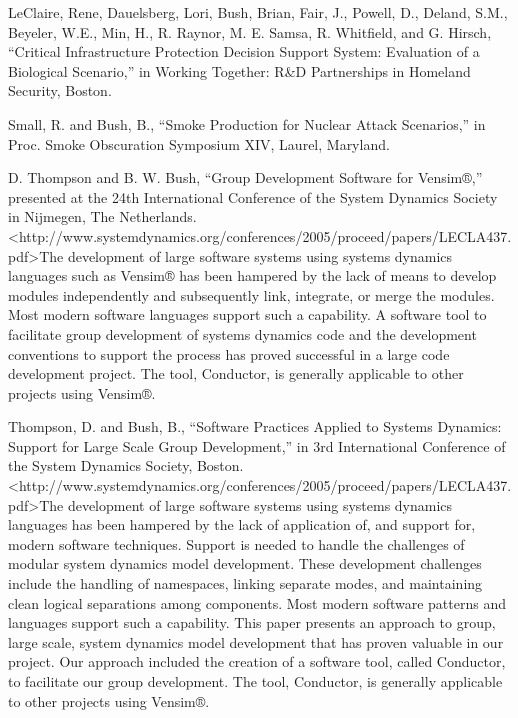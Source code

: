 \documentclass[]{article}
\begin{document}
LeClaire, Rene, Dauelsberg, Lori, Bush, Brian, Fair, J., Powell, D.,
Deland, S.M., Beyeler, W.E., Min, H., R. Raynor, M. E. Samsa, R.
Whitfield, and G. Hirsch, ``Critical Infrastructure Protection Decision
Support System: Evaluation of a Biological Scenario,'' in Working
Together: R\&D Partnerships in Homeland Security, Boston.

Small, R. and Bush, B., ``Smoke Production for Nuclear Attack
Scenarios,'' in Proc. Smoke Obscuration Symposium XIV, Laurel, Maryland.

D. Thompson and B. W. Bush, ``Group Development Software for Vensim®,''
presented at the 24th International Conference of the System Dynamics
Society in Nijmegen, The Netherlands.
\textless{}http://www.systemdynamics.org/conferences/2005/proceed/papers/LECLA437.pdf\textgreater{}The
development of large software systems using systems dynamics languages
such as Vensim® has been hampered by the lack of means to develop
modules independently and subsequently link, integrate, or merge the
modules. Most modern software languages support such a capability. A
software tool to facilitate group development of systems dynamics code
and the development conventions to support the process has proved
successful in a large code development project. The tool, Conductor, is
generally applicable to other projects using Vensim®.

Thompson, D. and Bush, B., ``Software Practices Applied to Systems
Dynamics: Support for Large Scale Group Development,'' in 3rd
International Conference of the System Dynamics Society, Boston.
\textless{}http://www.systemdynamics.org/conferences/2005/proceed/papers/LECLA437.pdf\textgreater{}The
development of large software systems using systems dynamics languages
has been hampered by the lack of application of, and support for, modern
software techniques. Support is needed to handle the challenges of
modular system dynamics model development. These development challenges
include the handling of namespaces, linking separate modes, and
maintaining clean logical separations among components. Most modern
software patterns and languages support such a capability. This paper
presents an approach to group, large scale, system dynamics model
development that has proven valuable in our project. Our approach
included the creation of a software tool, called Conductor, to
facilitate our group development. The tool, Conductor, is generally
applicable to other projects using Vensim®.
\end{document}
